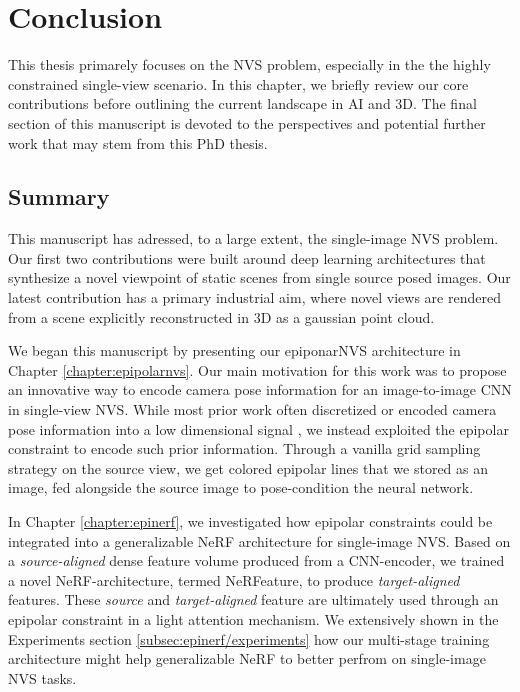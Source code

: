 \chapter{Conclusion}
\label{chapter:conclusion}

{}


This thesis primarely focuses on the \ac{NVS} problem, especially in the the highly constrained single-view scenario. In this chapter, we briefly review our core contributions before outlining the current landscape in \ac{AI} and 3D. The final section of this manuscript is devoted to the perspectives and potential further work that may stem from this PhD thesis.  

\section{Summary}

This manuscript has adressed, to a large extent, the single-image \ac{NVS} problem. Our first two contributions were built around deep learning architectures that synthesize a novel viewpoint of static scenes from single source posed images. Our latest contribution has a primary industrial aim, where novel views are rendered from a scene explicitly reconstructed in 3D as a gaussian point cloud.

We began this manuscript by presenting our epiponarNVS architecture in Chapter \ref{chapter:epipolarnvs}. Our main motivation for this work was to propose an innovative way to encode camera pose information for an image-to-image \ac{CNN} in single-view \ac{NVS}. While most prior work often discretized \citep{kim2020novel} or encoded camera pose information into a low dimensional signal \citep{sun2018multiview}, we instead exploited the epipolar constraint to encode such prior information. Through a vanilla grid sampling strategy on the source view, we get colored epipolar lines that we stored as an image, fed alongside the source image to pose-condition the neural network. 

In Chapter \ref{chapter:epinerf}, we investigated how epipolar constraints could be integrated into a generalizable \ac{NeRF} architecture for single-image \ac{NVS}. Based on a \textit{source-aligned} dense feature volume produced from a \ac{CNN}-encoder, we trained a novel \ac{NeRF}-architecture, termed NeRFeature, to produce \textit{target-aligned} features. These \textit{source} and \textit{target-aligned} feature are ultimately used through an epipolar constraint in a light attention mechanism. We extensively shown in the Experiments section \ref{subsec:epinerf/experiments} how our multi-stage training architecture might help generalizable \ac{NeRF} to better perfrom on single-image \ac{NVS} tasks.  

